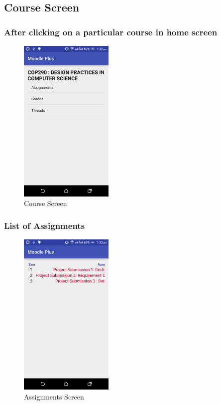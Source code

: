 \documentclass[12pt]{article}
\begin{document}
\subsection{Course Screen}
\subsubsection{After clicking on a particular course in home screen}
\begin{figure}[!ht]
	\centering
	\includegraphics[width=0.4\textwidth]{images/course_contents.png}
	\caption{Course Screen}
\end{figure}
\FloatBarrier
\subsubsection{List of Assignments}
\begin{figure}[!ht]
	\centering
	\includegraphics[width=0.4\textwidth]{images/assignments.png}
	\caption{Assignments Screen}
\end{figure}
\FloatBarrier
\end{document}
